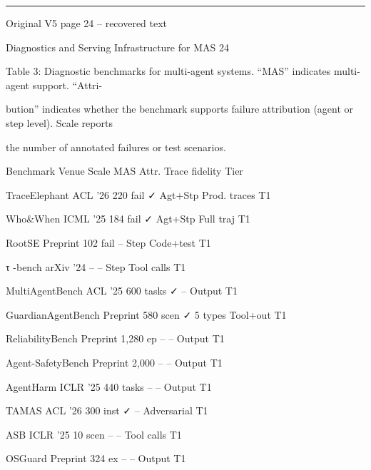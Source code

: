\par\smallskip\noindent\rule{\textwidth}{0.4pt}\par{\sffamily\footnotesize Original V5 page 24 -- recovered text}\par\begin{flushleft}\footnotesize\ttfamily
\par\smallskip
\par\smallskip
\noindent Diagnostics and Serving Infrastructure for MAS 24\par
\par\smallskip
\par\smallskip
\noindent Table 3: Diagnostic benchmarks for multi-agent systems. “MAS” indicates multi-agent support. “Attri-\par
\noindent bution” indicates whether the benchmark supports failure attribution (agent or step level). Scale reports\par
\noindent the number of annotated failures or test scenarios.\par
\par\smallskip
\noindent Benchmark Venue Scale MAS Attr. Trace fidelity Tier\par
\noindent TraceElephant ACL ’26 220 fail ✓ Agt+Stp Prod. traces T1\par
\noindent Who\&When ICML ’25 184 fail ✓ Agt+Stp Full traj T1\par
\noindent RootSE Preprint 102 fail – Step Code+test T1\par
\noindent τ -bench arXiv ’24 – – Step Tool calls T1\par
\noindent MultiAgentBench ACL ’25 600 tasks ✓ – Output T1\par
\noindent GuardianAgentBench Preprint 580 scen ✓ 5 types Tool+out T1\par
\noindent ReliabilityBench Preprint 1,280 ep – – Output T1\par
\noindent Agent-SafetyBench Preprint 2,000 – – Output T1\par
\noindent AgentHarm ICLR ’25 440 tasks – – Output T1\par
\noindent TAMAS ACL ’26 300 inst ✓ – Adversarial T1\par
\noindent ASB ICLR ’25 10 scen – – Tool calls T1\par
\noindent OSGuard Preprint 324 ex – – Output T1\par
\par\smallskip
\par\smallskip

\end{flushleft}
